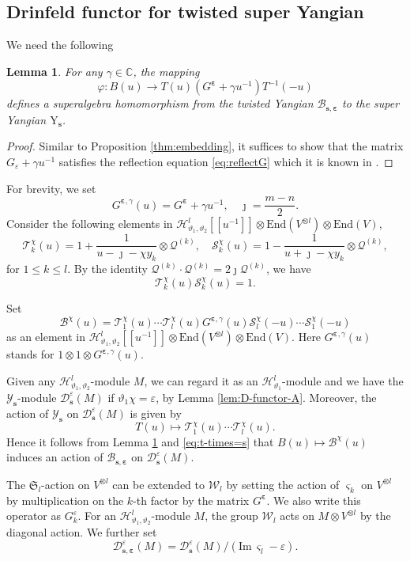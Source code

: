 \documentclass[11pt,reqno]{amsart}
\numberwithin{equation}{section}
\newtheorem{lem}[thm]{Lemma}
\theoremstyle{definition}
\theoremstyle{remark}
\newcommand{\beq}{\begin{equation}}
\newcommand{\eeq}{\end{equation}}
\newcommand{\C}{\mathbb{C}}
\newcommand{\mc}{\mathcal}
\newcommand{\fkS}{\mathfrak{S}}
\newcommand{\End}{\mathrm{End}}
\newcommand{\scrW}{\mathscr{W}}
\newcommand{\lle}{\leqslant}
\newcommand{\YMN}{{\mathscr{Y}_{\bm s}}}
\newcommand{\BMN}{{\mathscr{B}_{\bm s,\bm \ve}}}
\newcommand{\ve}{\varepsilon}
\newcommand{\s}{{\bm s}}
\begin{document}
\subsection{Drinfeld functor for twisted super Yangian}
We need the following
\begin{lem}\label{lem:embedding}
For any $\gamma\in\C$, the mapping
\beq\label{eq:emd-b-new}
\varphi: B(u)\to T(u) (G^{\bm\ve}+\gamma u^{-1})T^{-1}(-u)
\eeq
defines a superalgebra homomorphism from the twisted Yangian $\mathscr B_{\bm s,\bm\ve}$ to the super Yangian $\mathrm{Y}_{\bm s}$.
\end{lem}
\begin{proof}
Similar to Proposition \ref{thm:embedding}, it suffices to show that the matrix $G_{\ve}+\gamma u^{-1}$ satisfies the reflection equation \eqref{eq:reflectG} which it is known in \cite{Arnaudon2004general,Ragoucy2007analytical,Belliard2009nested}.
\end{proof}

For brevity, we set
$$
G^{\bm\ve,\gamma}(u)=G^{\bm\ve}+\gamma u^{-1},\quad \jmath=\frac{m-n}{2}.
$$
Consider the following elements in $\mathscr H^l_{\vartheta_1,\vartheta_2}[[u^{-1}]]\otimes \End(V^{\otimes l})\otimes \End(V)$,
\[
\mc T^{\chi}_k(u)=1+\frac{1}{u-\jmath-\chi y_k}\otimes \mc Q^{(k)},\quad \mc S^{\chi}_k(u)=1-\frac{1}{u+\jmath-\chi y_k}\otimes \mc Q^{(k)},
\]
for $1\lle k\lle l$. By the identity $\mc Q^{(k)}\cdot \mc Q^{(k)} = 2\jmath \mc Q^{(k)}$, we have
\beq\label{eq:t-times=s}
\mc T^{\chi}_k(u)\mc S^{\chi}_k(u)=1.
\eeq

Set
\beq\label{eq:B-chi}
\mc B^\chi(u)=\mc T_1^\chi(u)\cdots \mc T^{\chi}_l(u)G^{\bm\ve,\gamma}(u)\mc S_l^\chi(-u)\cdots \mc S^{\chi}_1(-u)
\eeq
as an element in $\mathscr H_{\vartheta_1,\vartheta_2}^l[[u^{-1}]]\otimes \End(V^{\otimes l})\otimes \End(V)$. Here $G^{\bm\ve,\gamma}(u)$ stands for $1\otimes 1\otimes G^{\bm\ve,\gamma}(u)$.

Given any $\mathscr H_{\vartheta_1,\vartheta_2}^l$-module $M$, we can regard it as an $\mathscr H_{\vartheta_1}^l$-module and we have the $\YMN$-module $\mc D_\s^{\ve}(M)$ if $\vartheta_1\chi =\ve$, by Lemma \ref{lem:D-functor-A}. Moreover,  the action of $\YMN$ on $\mc D_\s^{\ve}(M)$ is given by
$$
T(u)\mapsto \mc T_1^\chi(u)\cdots \mc T^{\chi}_l(u).
$$
Hence it follows from Lemma \ref{lem:embedding} and \eqref{eq:t-times=s} that $B(u)\mapsto \mc B^\chi(u)$ induces an action of $\BMN$ on $\mc D^{\ve}_\s(M)$.

The $\fkS_l$-action on $V^{\otimes l}$ can be extended to $\scrW_l$ by setting the action of $\varsigma_k$ on $V^{\otimes l}$ by multiplication on the $k$-th factor by the matrix $G^{\bm \ve}$. We also write this operator as $G^{\ve}_k$. For an $\mathscr H_{\vartheta_1,\vartheta_2}^l$-module $M$, the group $\scrW_l$ acts on $M\otimes V^{\otimes l}$ by the diagonal action. We further set
\[
\mc D_{\s,\bm\ve}^{\ve}(M)=\mc D_{\s}^\ve(M)/(\mathrm{Im}\,\varsigma_l-\ve).
\]
\end{document}
